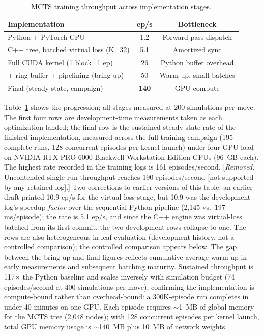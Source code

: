 \documentclass[journal]{IEEEtran}
\newcommand{\added}[1]{{\color{blue}#1}}
\newcommand{\removed}[1]{{\color{red}[\textit{Removed:} #1]}}
\newcommand{\added}[1]{#1}
\newcommand{\removed}[1]{}
\begin{document}
\begin{table}[t]
\centering
\caption{MCTS training throughput across implementation stages.}
\label{tab:throughput}
\begin{tabular}{lcc}
\toprule
Implementation & ep/s & Bottleneck \\
\midrule
Python + PyTorch CPU & 1.2 & Forward pass dispatch \\
C++ tree, batched virtual loss (K=32) & 5.1 & Amortized sync \\
Full CUDA kernel (1 block=1 ep) & 26 & Python buffer overhead \\
+ ring buffer + pipelining (bring-up) & 50 & Warm-up, small batches \\
Final (steady state, campaign) & \textbf{140} & GPU compute \\
\bottomrule
\end{tabular}
\end{table}

Table~\ref{tab:throughput} shows the progression; all stages measured at 200 simulations per move. The first four rows are development-time measurements taken as each optimization landed; the final row is the sustained steady-state rate of the finished implementation, measured across the full training campaign (195 complete runs, 128 concurrent episodes per kernel launch) under four-GPU load on NVIDIA RTX PRO 6000 Blackwell Workstation Edition GPUs (96~GB each). \added{The highest rate recorded in the training logs is 161 episodes/second.} \removed{Uncontended single-run throughput reaches 190 episodes/second [not supported by any retained log].} Two corrections to earlier versions of this table: an earlier draft printed 10.9 ep/s for the virtual-loss stage, but 10.9 was the development log's speedup \textit{factor} over the sequential Python pipeline (2{,}145 vs.\ 197 ms/episode); the rate is 5.1 ep/s, and since the C++ engine was virtual-loss batched from its first commit, the two development rows collapse to one. The rows are also heterogeneous in leaf evaluation (development history, not a controlled comparison); the controlled comparison appears below. The gap between the bring-up and final figures reflects cumulative-average warm-up in early measurements and subsequent batching maturity. Sustained throughput is 117$\times$ the Python baseline and scales inversely with simulation budget (74 episodes/second at 400 simulations per move), confirming the implementation is compute-bound rather than overhead-bound: a 300K-episode run completes in under 40 minutes on one GPU. Each episode requires $\sim$1~MB of global memory for the MCTS tree (2,048 nodes); with 128 concurrent episodes per kernel launch, total GPU memory usage is $\sim$140~MB plus 10~MB of network weights.
\end{document}
